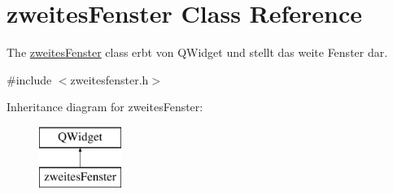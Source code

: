 \hypertarget{classzweites_fenster}{}\section{zweites\+Fenster Class Reference}
\label{classzweites_fenster}


The \hyperlink{classzweites_fenster}{zweites\+Fenster} class erbt von Q\+Widget und stellt das weite Fenster dar.  




{\ttfamily \#include $<$zweitesfenster.\+h$>$}

Inheritance diagram for zweites\+Fenster\+:\begin{figure}[H]
\begin{center}
\leavevmode
\includegraphics[height=2.000000cm]{classzweites_fenster}
\end{center}
\end{figure}
